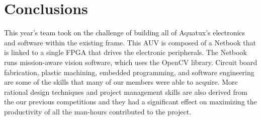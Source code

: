 \section{Conclusions} 
\vspace{-.03in}

This year's team took on the challenge of building all of Aquatux's electronics
and software within the existing frame. This AUV is composed of a Netbook that
is linked to a single FPGA that drives the electronic peripherals.
The Netbook runs mission-aware vision software, which uses the OpenCV library.
Circuit board fabrication, plastic machining, embedded programming,
and software engineering are some
of the skills that many of our members were able to acquire. More
rational design techniques and project management skills are also
derived from the our previous competitions and they had a significant
effect on maximizing the productivity of all the man-hours contributed
to the project.

